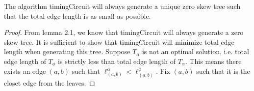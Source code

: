 \documentclass[11pt]{scrartcl}
\begin{document}
\iffalse
\begin{lemma}
	If $L_\alpha = L_\phi$ and $R_\alpha = R_\phi$,	then $\ell^\alpha_{(v,l)} \leq \ell^\phi_{(v,l)}$ and 
	$\ell^\alpha_{(v,r)} \leq \ell^\phi_{(v,r)}$.
\end{lemma}
\begin{proof}
	Consider the case when $\delta_l + \ell_{(v,l)} > \delta_r + \ell_{(v,r)}$.
	We show $\ell^\alpha_{(v,l)} \leq \ell^\phi_{(v,l)}$ and 
	$\ell^\alpha_{(v,r)} \leq \ell^\phi_{(v,r)}$.
	Suppose for the sake of contradiction, $\ell^\alpha_{(v,l)} > \ell^\phi_{(v,l)}$.

\end{proof}
\fi
\begin{theorem}
	The algorithm timingCircuit will always generate a unique zero skew tree such that the 
	total edge length is as small as possible.
\end{theorem}
\begin{proof}
	From lemma 2.1, we know that timingCircuit will always generate a zero skew tree. 
	It is sufficient to show that timingCircuit will minimize total edge length when
	generating this tree. %
	Suppose $T_\alpha$ is not an optimal solution, i.e. total edge length of $T_\phi$ 
	is strictly less than total edge length of $T_\alpha$.
	This means there exists an edge $(a,b)$ such that $\ell^\alpha_{(a,b)} < \ell^\phi_{(a,b)}$.
	Fix $(a,b)$ such that it is the closet edge from the leaves. 
	
\end{proof}







\iffalse
We will use an exchange argument argument to prove this greedy strategy
\subsubsection{
	Define Your Solution
}
Let $T_g = (V, E, \ell^g)$ be the tree generated by our greedy algorithm, where $\ell^g$
is the associated edge length of $T_g$.   
Let $T_o = (V, E, \ell^o)$ be a tree that is 
generated by an optimal algorithm where $T_o$ has zero skew and the total edge length is as small as possible.




\subsubsection{
	Compare Solutions
}
If $\ell^g \neq \ell^o$, there exists an edge $(a,b) \in E$ such that $\ell^g_{a,b} \neq \ell^o_{a,b}$.

\subsubsection{
	Exchange Pieces
}
\subsubsection{
	Iterate
}
\fi
\end{document}
